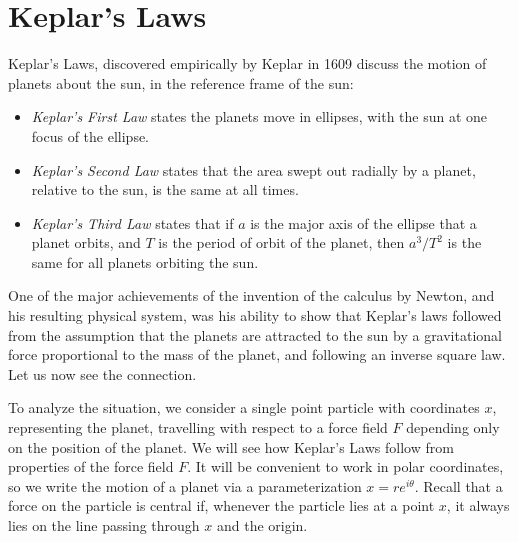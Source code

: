 \chapter{Keplar's Laws}

Keplar's Laws, discovered empirically by Keplar in 1609 discuss the motion of planets about the sun, in the reference frame of the sun:
%
\begin{itemize}
    \item \emph{Keplar's First Law} states the planets move in ellipses, with the sun at one focus of the ellipse.

    \item \emph{Keplar's Second Law} states that the area swept out radially by a planet, relative to the sun, is the same at all times.

    \item \emph{Keplar's Third Law} states that if $a$ is the major axis of the ellipse that a planet orbits, and $T$ is the period of orbit of the planet, then $a^3/T^2$ is the same for all planets orbiting the sun.
\end{itemize}
%
One of the major achievements of the invention of the calculus by Newton, and his resulting physical system, was his ability to show that Keplar's laws followed from the assumption that the planets are attracted to the sun by a gravitational force proportional to the mass of the planet, and following an inverse square law. Let us now see the connection.

To analyze the situation, we consider a single point particle with coordinates $x$, representing the planet, travelling with respect to a force field $F$ depending only on the position of the planet. We will see how Keplar's Laws follow from properties of the force field $F$. It will be convenient to work in polar coordinates, so we write the motion of a planet via a parameterization $x = r e^{i \theta}$. Recall that a force on the particle is central if, whenever the particle lies at a point $x$, it always lies on the line passing through $x$ and the origin.

